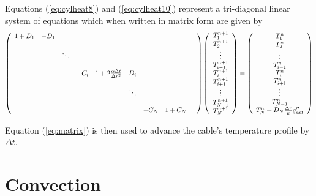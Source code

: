 Equations (\ref{eq:cylheat8}) and (\ref{eq:cylheat10}) represent a  tri-diagonal linear system of equations which when written in matrix form
are given by
\begin{equation}
\left(
\begin{array}{ccccccccc}
  1+D_1 & -D_1 &  &  &  &  &  &  &  \\
   &  &  &  &  &  &  &  &  \\
   &  &\ddots  &  &  &  &  &  &  \\
   &  &  &  &  &  &  &  &  \\
   &  &  & -C_i &1+2\frac{\alpha\Delta t}{\Delta r^2}  &D_i  &  &  &  \\
   &  &  &  &  &  &  &  &  \\
   &  &  &  &  & \ddots &  &  &  \\
   &  &  &  &  &  &  &  &  \\
   &  &  &  &  &  &-C_N  &1+C_N  &
\end{array}
\right)
\left(
  \begin{array}{c}
    T_1^{n+1}\\
    T_2^{n+1}\\
    \vdots\\
    T_{i-1}^{n+1} \\
    T_i^{n+1} \\
    T_{i+1}^{n+1}\\
    \vdots\\
    T_{N-1}^{n+1}\\
    T_N^{n+1}
  \end{array}
\right)
=
\left(
  \begin{array}{c}
    T_1^{n}\\
    T_2^{n}\\
    \vdots\\
    T_{i-1}^{n} \\
    T_i^{n} \\
    T_{i+1}^{n}\\
    \vdots\\
    T_{N-1}^{n}\\
    T_N^{n}+D_N\frac{\Delta r}{k}\dot{q}''_{ext}
  \end{array}
\right)
\label{eq:matrix}
\end{equation}

\noindent Equation (\ref{eq:matrix}) is then used to
advance the cable's temperature profile by $\Delta t$.

\section{Convection}

